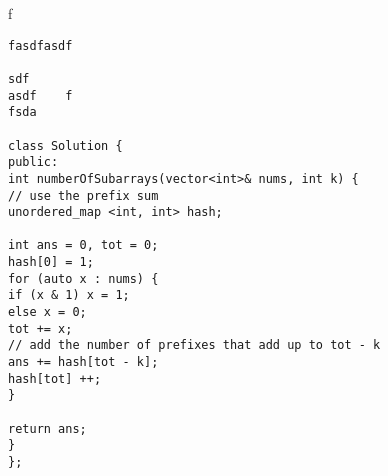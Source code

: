 \documentclass{article}
\begin{document}
f 
\begin{verbatim}
fasdfasdf

sdf 
asdf    f
fsda

class Solution {
public:
int numberOfSubarrays(vector<int>& nums, int k) {
// use the prefix sum
unordered_map <int, int> hash;

int ans = 0, tot = 0;
hash[0] = 1;
for (auto x : nums) {
if (x & 1) x = 1;
else x = 0;
tot += x;
// add the number of prefixes that add up to tot - k
ans += hash[tot - k]; 
hash[tot] ++;
}

return ans;
}
};

\end{verbatim}
\end{document}
